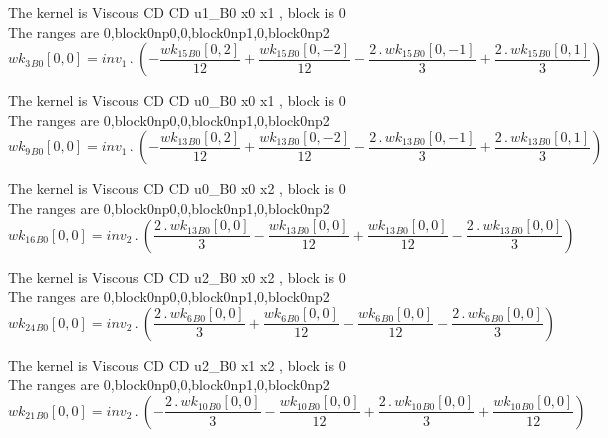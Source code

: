 \documentclass{article}
\begin{document}
\noindent The kernel is Viscous CD CD u1_B0 x0 x1 , block is 0\\\noindent The ranges are 0,block0np0,0,block0np1,0,block0np2\\\begin{dmath}{wk_{3}{_{B0}}}[{0,0}] = inv_1 \,.\, \left(- \frac{{wk_{15}{_{B0}}}[{0,2}]}{12} + \frac{{wk_{15}{_{B0}}}[{0,-2}]}{12} - \frac{2 \,.\, {wk_{15}{_{B0}}}[{0,-1}]}{3} + \frac{2 \,.\, {wk_{15}{_{B0}}}[{0,1}]}{3}\right)\end{dmath}

\noindent The kernel is Viscous CD CD u0_B0 x0 x1 , block is 0\\\noindent The ranges are 0,block0np0,0,block0np1,0,block0np2\\\begin{dmath}{wk_{9}{_{B0}}}[{0,0}] = inv_1 \,.\, \left(- \frac{{wk_{13}{_{B0}}}[{0,2}]}{12} + \frac{{wk_{13}{_{B0}}}[{0,-2}]}{12} - \frac{2 \,.\, {wk_{13}{_{B0}}}[{0,-1}]}{3} + \frac{2 \,.\, {wk_{13}{_{B0}}}[{0,1}]}{3}\right)\end{dmath}

\noindent The kernel is Viscous CD CD u0_B0 x0 x2 , block is 0\\\noindent The ranges are 0,block0np0,0,block0np1,0,block0np2\\\begin{dmath}{wk_{16}{_{B0}}}[{0,0}] = inv_2 \,.\, \left(\frac{2 \,.\, {wk_{13}{_{B0}}}[{0,0}]}{3} - \frac{{wk_{13}{_{B0}}}[{0,0}]}{12} + \frac{{wk_{13}{_{B0}}}[{0,0}]}{12} - \frac{2 \,.\, {wk_{13}{_{B0}}}[{0,0}]}{3}\right)\end{dmath}

\noindent The kernel is Viscous CD CD u2_B0 x0 x2 , block is 0\\\noindent The ranges are 0,block0np0,0,block0np1,0,block0np2\\\begin{dmath}{wk_{24}{_{B0}}}[{0,0}] = inv_2 \,.\, \left(\frac{2 \,.\, {wk_{6}{_{B0}}}[{0,0}]}{3} + \frac{{wk_{6}{_{B0}}}[{0,0}]}{12} - \frac{{wk_{6}{_{B0}}}[{0,0}]}{12} - \frac{2 \,.\, {wk_{6}{_{B0}}}[{0,0}]}{3}\right)\end{dmath}

\noindent The kernel is Viscous CD CD u2_B0 x1 x2 , block is 0\\\noindent The ranges are 0,block0np0,0,block0np1,0,block0np2\\\begin{dmath}{wk_{21}{_{B0}}}[{0,0}] = inv_2 \,.\, \left(- \frac{2 \,.\, {wk_{10}{_{B0}}}[{0,0}]}{3} - \frac{{wk_{10}{_{B0}}}[{0,0}]}{12} + \frac{2 \,.\, {wk_{10}{_{B0}}}[{0,0}]}{3} + \frac{{wk_{10}{_{B0}}}[{0,0}]}{12}\right)\end{dmath}
\end{document}
